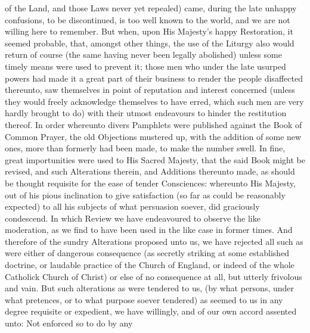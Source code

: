 of the Land, and those Laws never yet repealed) came, during the late unhappy confusions, to be discontinued, is too well known to the world, and we are not willing here to remember. But when, upon His Majesty’s happy Restoration, it seemed probable, that, amongst other things, the use of the Liturgy also would return of course (the same having never been legally abolished) unless some timely means were used to prevent it; those men who under the late usurped powers had made it a great part of their business to render the people disaffected thereunto, saw themselves in point of reputation and interest concerned (unless they would freely acknowledge themselves to have erred, which such men are very hardly brought to do) with their utmost endeavours to hinder the restitution thereof. In order whereunto divers Pamphlets were published against the Book of Common Prayer, the old Objections mustered up, with the addition of some new ones, more than formerly had been made, to make the number swell. In fine, great importunities were used to His Sacred Majesty, that the said Book might be revised, and such Alterations therein, and Additions thereunto made, as should be thought requisite for the ease of tender Consciences: whereunto His Majesty, out of his pious inclination to give satisfaction (so far as could be reasonably expected) to all his subjects of what persuasion soever, did graciously condescend. In which Review we have endeavoured to observe the like moderation, as we find to have been used in the like case in former times. And therefore of the sundry Alterations proposed unto us, we have rejected all such as were either of dangerous consequence (as secretly striking at some established doctrine, or laudable practice of the Church of England, or indeed of the whole Catholick Church of Christ) or else of no consequence at all, but utterly frivolous and vain. But such alterations as were tendered to us, (by what persons, under what pretences, or to what purpose soever tendered) as seemed to us in any degree requisite or expedient, we have willingly, and of our own accord assented unto: Not enforced so to do by any

